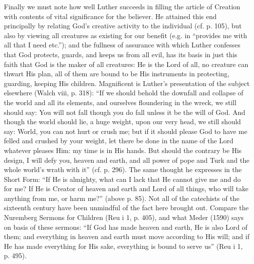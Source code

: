 Finally we must note how well Luther succeeds in filling the article of Creation with contents of vital significance for the believer. He attained this end principally by relating God’s creative activity to the individual (cf. p. 105), but also by viewing all creatures as existing for our benefit (e.g. in “provides me with all that I need
etc.”); and the fullness of assurance with which Luther confesses that God protects, guards, and keeps us from all evil, has its basis in just this faith that God is the maker of all creatures: He is the Lord of all, no creature can thwart His plan, all of them are bound to be His instruments in protecting, guarding, keeping His children. Magnificent is Luther’s presentation of the subject elsewhere (Walch viii, p. 318): “If we should behold the downfall and collapse of the world and all its elements, and ourselves floundering in the wreck, we still should say: You will not fall though you do fall unless it be the will of God. And though the world should lie, a huge weight, upon our very head, we still should say: World, you can not hurt or crush me; but if it should please God to have me felled and crushed by your weight, let there be done in the name of the Lord whatever pleases Him: my time is in His hands. But should the contrary be His design, I will defy you, heaven and earth, and all power of pope and Turk and the whole world’s wrath with it” (cf. p. 296). The same thought he expresses in the Short Form: “If He is almighty, what can I lack that He cannot give me and do for me? If He is Creator of heaven and earth and Lord of all things, who will take anything from me, or harm me?” (above p. 85). Not all of the catechists of the sixteenth century have been unmindful of the fact here brought out. Compare the Nuremberg Sermons for Children (Reu i 1, p. 405), and what Meder (1590) says on basis of these sermons: “If God has made heaven and earth, He is also Lord of them; and everything in heaven and earth must move according to His will; and if He has made everything for His sake, everything is bound to serve us” (Reu i 1, p. 495).

